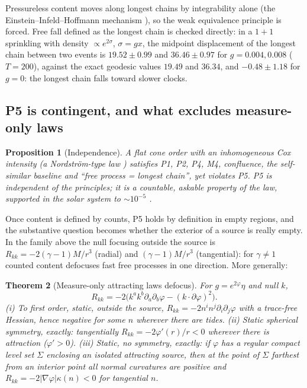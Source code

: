 \documentclass[11pt]{article}
\newtheorem{theorem}{Theorem}
\newtheorem{proposition}[theorem]{Proposition}
\theoremstyle{definition}
\theoremstyle{remark}
\begin{document}
Pressureless content moves along longest chains by integrability alone (the Einstein--Infeld--Hoffmann mechanism \cite{eih}), so the weak equivalence principle is forced. Free fall defined as the longest chain is checked directly: in a $1+1$ sprinkling with density $\propto e^{2\sigma}$, $\sigma=gx$, the midpoint displacement of the longest chain between two events is $19.52\pm0.99$ and $36.46\pm0.97$ for $g=0.004,0.008$ ($T=200$), against the exact geodesic values $19.49$ and $36.34$, and $-0.48\pm1.18$ for $g=0$: the longest chain falls toward slower clocks.

\subsection{P5 is contingent, and what excludes measure-only laws}

\begin{proposition}[Independence]
A flat cone order with an inhomogeneous Cox intensity (a Nordstr\"om-type law \cite{nordstrom}) satisfies P1, P2, P4, M4, confluence, the self-similar baseline and ``free process = longest chain'', yet violates P5. P5 is independent of the principles; it is a countable, askable property of the law, supported in the solar system to $\sim10^{-5}$ \cite{cassini,will}.
\end{proposition}

Once content is defined by counts, P5 holds by definition in empty regions, and the substantive question becomes whether the exterior of a source is really empty. In the family above the null focusing outside the source is $R_{kk}=-2(\gamma-1)M/r^3$ (radial) and $(\gamma-1)M/r^3$ (tangential): for $\gamma\neq1$ counted content defocuses fast free processes in one direction. More generally:

\begin{theorem}[Measure-only attracting laws defocus]\label{thm:defocus}
For $g=e^{2\varphi}\eta$ and null $k$,\[R_{kk}=-2\big(k^ak^b\partial_a\partial_b\varphi-(k\cdot\partial\varphi)^2\big).\](i) To first order, static, outside the source, $R_{kk}=-2n^in^j\partial_i\partial_j\varphi$ with a trace-free Hessian, hence negative for some $n$ wherever there are tides. (ii) Static spherical symmetry, exactly: tangentially $R_{kk}=-2\varphi'(r)/r<0$ wherever there is attraction ($\varphi'>0$). (iii) Static, no symmetry, exactly: if $\varphi$ has a regular compact level set $\Sigma$ enclosing an isolated attracting source, then at the point of $\Sigma$ farthest from an interior point all normal curvatures are positive and $R_{kk}=-2|\nabla\varphi|\kappa(n)<0$ for tangential $n$.
\end{theorem}
\end{document}
